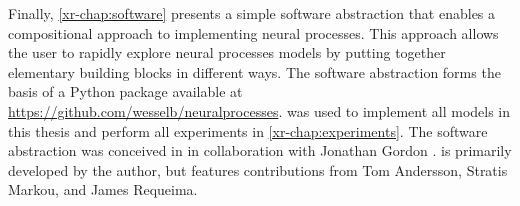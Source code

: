 \documentclass[12pt, twoside]{report}
\newcommand{\xrprefix}[1]{xr-#1}
\begin{document}
Finally, \cref{\xrprefix{chap:software}} presents a simple software abstraction that enables a compositional approach to implementing neural processes.
This approach allows the user to rapidly explore neural processes models by putting together elementary building blocks in different ways.
The software abstraction forms the basis of a Python package  \parencite{Bruinsma:NeuralProcesses} available at \url{https://github.com/wesselb/neuralprocesses}.
 was used to implement all models in this thesis and perform all experiments in \cref{\xrprefix{chap:experiments}}.
The software abstraction was conceived in  in collaboration with Jonathan Gordon \parencite{Bruinsma:NeuralProcesses_jl}.
 is primarily developed by the author, but features contributions from Tom Andersson, Stratis Markou, and James Requeima.
\end{document}
